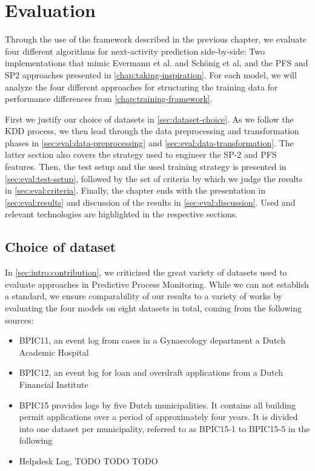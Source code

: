 \chapter{Evaluation}\label{chap:evaluation}
Through the use of the framework described in the previous chapter, we evaluate four different algorithms for next-activity prediction side-by-side: Two implementations that mimic Evermann et al. and Schönig et al, and the PFS and SP2 approaches presented in \autoref{chap:taking-inspiration}. For each model, we will analyze the four different approaches for structuring the training data for performance differences from \autoref{chap:training-framework}.

First we justify our choice of datasets in \autoref{sec:dataset-choice}. As we follow the KDD process, we then lead through the data preprocessing and transformation phases in \autoref{sec:eval:data-preprocessing} and \autoref{sec:eval:data-transformation}. The latter section also covers the strategy used to engineer the SP-2 and PFS features. Then, the test setup and the used training strategy is presented in \autoref{sec:eval:test-setup}, followed by the set of criteria by which we judge the results in \autoref{sec:eval:criteria}. Finally, the chapter ends with the presentation in \autoref{sec:eval:results} and discussion of the results in \autoref{sec:eval:discussion}. Used and relevant technologies are highlighted in the respective sections.

\section{Choice of dataset}
\label{sec:dataset-choice}
In \autoref{sec:intro:contribution}, we criticized the great variety of datasets used to evaluate approaches in Predictive Process Monitoring. While we can not establish a standard, we ensure comparability of our results to a variety of works by evaluating the four models on eight datasets in total, coming from the following sources:

\begin{itemize}
    \item BPIC11, an event log from cases in a Gynaecology department a Dutch Academic Hospital~\cite{BPIC2011}
    \item BPIC12, an event log for loan and overdraft applications from a Dutch Financial Institute~\cite{BPIC2012}
    \item BPIC15 provides logs by five Dutch municipalities. It contains all building permit applications over a period of approximately four years. It is divided into one dataset per municipality, referred to as BPIC15-1 to BPIC15-5 in the following~\cite{BPIC2015}
    \item Helpdesk Log, TODO TODO TODO
\end{itemize}

